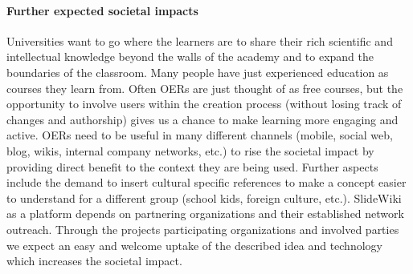 \documentclass[ngerman,UKenglish,table]{scrbook}
\begin{document}
\paragraph{Further expected societal impacts}
Universities want to go where the learners are to share their rich scientific and intellectual knowledge beyond the walls of the academy and to expand the boundaries of the classroom.
Many people have just experienced education as courses they learn from. 
Often OERs are just thought of as free courses, but the opportunity to involve users within the creation process (without losing track of changes and authorship) gives us a chance to make learning more engaging and active.
OERs need to be useful in many different channels (mobile, social web, blog, wikis, internal company networks, etc.) to rise the societal impact by providing direct benefit to the context they are being used.
Further aspects include the demand to insert cultural specific references to make a concept easier to understand for a different group (school kids, foreign culture, etc.).
SlideWiki as a platform depends on partnering organizations and their established network outreach.
Through the projects participating organizations and involved parties we expect an easy and welcome uptake of the described idea and technology which increases the societal impact.



\appendix



\backmatter

 {\raggedright
   

   
}

\listoffigures
\listoftables


%
% 
\end{document}
